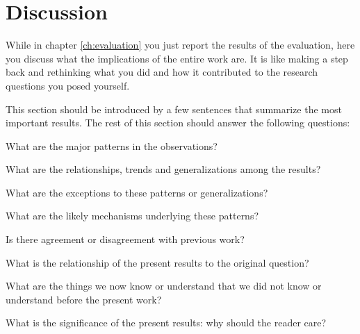 \chapter{Discussion}
\label{ch:discussion}

While in chapter \ref{ch:evaluation} you just report the results of the
evaluation, here you discuss what the implications of the entire work are. It is
like making a step back and rethinking what you did and how it contributed to
the research questions you posed yourself.

This section should be introduced by a few sentences that summarize the most
important results. The rest of this section should answer the following
questions:

\begin{tight_enumerate}
  \item What are the major patterns in the observations?
  \item What are the relationships, trends and generalizations among the results?
  \item What are the exceptions to these patterns or generalizations?
  \item What are the likely mechanisms underlying these patterns?
  \item Is there agreement or disagreement with previous work?
  \item What is the relationship of the present results to the original question?
  \item What are the things we now know or understand that we did not know or understand before the present work?
  \item What is the significance of the present results: why should the reader care?
\end{tight_enumerate}
